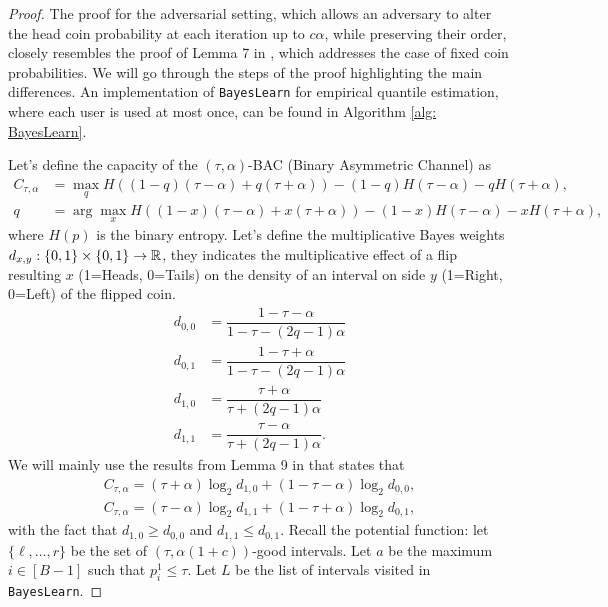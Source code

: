 \begin{proof}
The proof for the adversarial setting, which allows an adversary to alter the head coin probability at each iteration up to $c\alpha$, while preserving their order, closely resembles the proof of Lemma 7 in \cite{gretta2023sharp}, which addresses the case of fixed coin probabilities. We will go through the steps of the proof highlighting the main differences. An implementation of \texttt{BayesLearn} for empirical quantile estimation, where each user is used at most once, can be found in Algorithm \ref{alg: BayesLearn}.
%


Let's define the capacity of the $(\tau, \alpha)$-BAC (Binary Asymmetric Channel) as
\begin{align*}
    C_{\tau, \alpha} &= \max_{q} H((1-q)(\tau-\alpha)+q(\tau+\alpha)) -(1-q)H(\tau-\alpha)-qH(\tau+\alpha), \\
    q&=\arg \max_x H((1-x)(\tau-\alpha)+x(\tau+\alpha)) -(1-x)H(\tau-\alpha)-xH(\tau+\alpha),
\end{align*}
where $H(p)$ is the binary entropy. Let's define the multiplicative Bayes weights $d_{x,y}:\{0,1\}\times \{0,1\}\rightarrow \mathbb{R}$, they indicates the multiplicative effect of a flip resulting $x$ (1=Heads, 0=Tails) on the density of an interval on side $y$ (1=Right, 0=Left) of the flipped coin.
\begin{align*}
    d_{0,0} &= \dfrac{1-\tau-\alpha}{1-\tau-(2q-1)\alpha}\\
    d_{0,1} &= \dfrac{1-\tau+\alpha}{1-\tau-(2q-1)\alpha}\\
    d_{1,0} &= \dfrac{\tau +\alpha}{\tau+(2q-1)\alpha}\\
    d_{1,1} &= \dfrac{\tau-\alpha}{\tau+(2q-1)\alpha}.
\end{align*}
We will mainly use the results from Lemma 9 in \cite{gretta2023sharp} that states that
\begin{gather}
    C_{\tau, \alpha} = (\tau + \alpha)\log_2 d_{1,0} + (1-\tau-\alpha)\log_2 d_{0,0} \label{eq: lemma A.1 [1]},\\
    C_{\tau, \alpha} = (\tau -\alpha)\log_2 d_{1,1} + (1-\tau+\alpha)\log_2 d_{0,1} \label{eq: lemma A.1 [2]},
\end{gather}
with the fact that $d_{1,0} \geq d_{0,0}$ and $d_{1,1}\leq d_{0,1}$. Recall the potential function: let $\{\ell,\dots,r\}$ be the set of $(\tau,\alpha(1+c))$-good intervals. Let $a$ be the maximum $i \in [B-1]$ such that $p^1_i\leq \tau$. Let $L$ be the list of intervals visited in \texttt{BayesLearn}. 
%
%


\end{proof}
